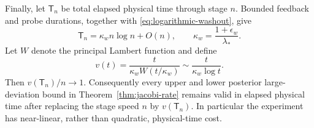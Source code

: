 Finally, let \(\mathsf T_n\) be total elapsed physical time through stage
\(n\).  Bounded feedback and probe durations, together with
\eqref{eq:logarithmic-washout}, give
\begin{equation}
 \mathsf T_n=\kappa_w n\log n+O(n),
 \qquad \kappa_w=\frac{1+\epsilon_w}{\lambda_*}.
 \label{eq:physical-time-complexity}
\end{equation}
Let \(W\) denote the principal Lambert function and define
\begin{equation}
 v(t)=\frac{t}{\kappa_w W(t/\kappa_w)}
 \sim\frac{t}{\kappa_w\log t}.
 \label{eq:physical-time-speed}
\end{equation}
Then \(v(\mathsf T_n)/n\to1\).  Consequently every upper and lower posterior
large-deviation bound in Theorem~\ref{thm:jacobi-rate} remains valid in elapsed
physical time after replacing the stage speed \(n\) by
\(v(\mathsf T_n)\).  In particular the experiment has near-linear, rather
than quadratic, physical-time cost.
